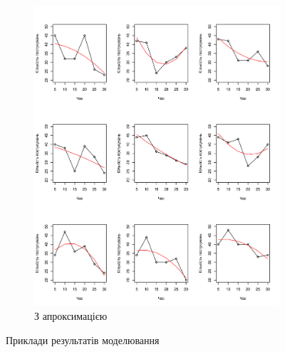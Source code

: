 \begin{figure}[h]
\begin{subfigure}[b]{0.45\textwidth}
    \includegraphics[width=\textwidth]{images/poisson_approximation}
    \caption{З апроксимацією}
    \label{fig:tapping:poisson:sqr}
  \end{subfigure}
  \caption{Приклади результатів моделювання}
\end{figure}

